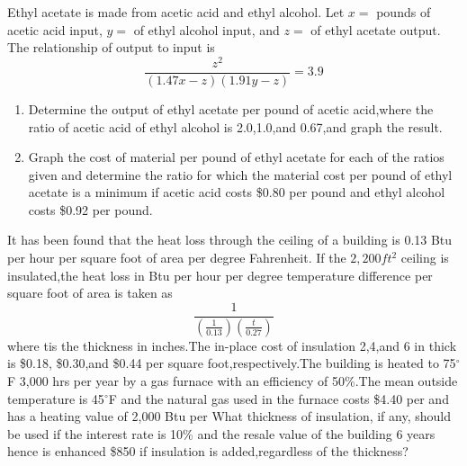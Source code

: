 \begin{exercises}
    \begin{exercise}
    \label{sea-9-5}
        Ethyl acetate is made from acetic acid and ethyl alcohol. Let $x=$ pounds of acetic acid input, $y=$ of ethyl alcohol input, and $z=$ of ethyl acetate output. The relationship of output to input is
        \begin{equation}
            \frac{z^2}{(1.47x-z)(1.91y-z)}=3.9
        \end{equation}
        \begin{enumerate}[label=\alph*)]
            \item Determine the output of ethyl acetate per pound of acetic acid,where the ratio of acetic acid of ethyl alcohol is 2.0,1.0,and 0.67,and graph the result.
            \item Graph the cost of material per pound of ethyl acetate for each of the ratios given and determine the ratio for which the material cost per pound of ethyl acetate is a minimum if acetic acid costs \$0.80 per pound and ethyl alcohol costs \$0.92 per pound.
        \end{enumerate}
    \end{exercise}
    \begin{solution}
    \end{solution}
    
    \begin{exercise}
    \label{sea-9-6}
        It has been found that the heat loss through the ceiling of a building is 0.13 Btu per hour per square foot of area per degree Fahrenheit. If the $2,200ft^2$ ceiling is insulated,the heat loss in Btu per hour per degree temperature difference per square foot of area is taken as
        \begin{equation}
            \frac{1}{(\frac{1}{0.13})(\frac{t}{0.27})}
        \end{equation}
        where tis the thickness in inches.The in-place cost of insulation 2,4,and 6 in thick is \$0.18, \$0.30,and \$0.44 per square foot,respectively.The building is heated to 75$^{\circ}$F 3,000 hrs per year by a gas furnace with an efficiency of 50\%.The mean outside temperature is 45$^{\circ}$F and the natural gas used in the furnace costs \$4.40 per and has a heating value of 2,000 Btu per What thickness of insulation, if any, should be used if the interest rate is 10\% and the resale value of the building 6 years hence is enhanced \$850 if insulation is added,regardless of the thickness?
    \end{exercise}
    \begin{solution}
    \end{solution}
    

\end{exercises}
